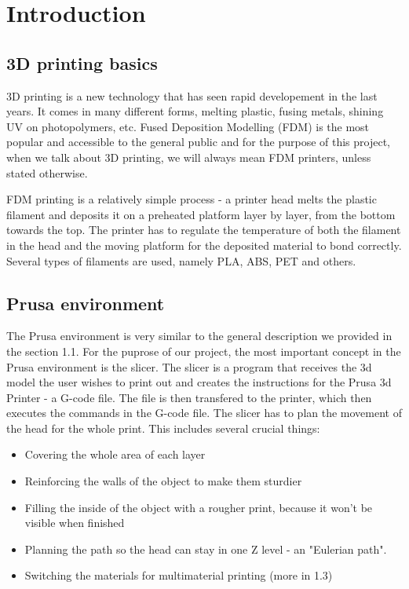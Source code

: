 \chapter{Introduction}

\section{3D printing basics}

3D printing is a new technology that has seen rapid developement in the last years. It comes in many different forms, melting plastic, fusing metals, shining UV on photopolymers, etc. Fused Deposition Modelling (FDM) is the most popular and accessible to the general public and for the purpose of this project, when we talk about 3D printing, we will always mean FDM printers, unless stated otherwise.

FDM printing is a relatively simple process - a printer head melts the plastic filament and deposits it on a preheated platform layer by layer, from the bottom towards the top. The printer has to regulate the temperature of both the filament in the head and the moving platform for the deposited material to bond correctly. Several types of filaments are used, namely PLA, ABS, PET and others.

\section{Prusa environment}

The Prusa environment is very similar to the general description we provided in the section 1.1. For the puprose of our project, the most important concept in the Prusa environment is the slicer. The slicer is a program that receives the 3d model the user wishes to print out and creates the instructions for the Prusa 3d Printer - a G-code file. The file is then transfered to the printer, which then executes the commands in the G-code file. The slicer has to plan the movement of the head for the whole print. This includes several crucial things:

\begin{itemize}
\item Covering the whole area of each layer
\item Reinforcing the walls of the object to make them sturdier
\item Filling the inside of the object with a rougher print, because it won't be visible when finished
\item Planning the path so the head can stay in one Z level - an "Eulerian path".
\item Switching the materials for multimaterial printing (more in 1.3)
\end{itemize}

